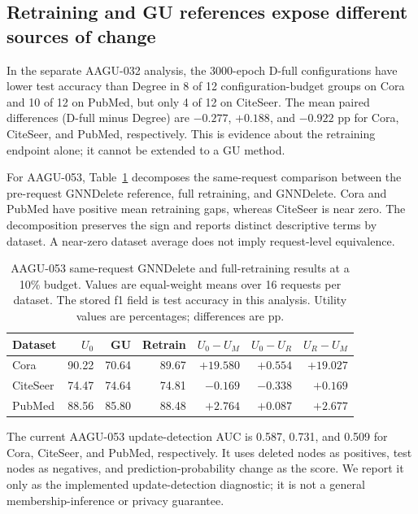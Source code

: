 \subsection{Retraining and GU references expose different sources of change}
In the separate AAGU-032 analysis, the 3000-epoch D-full configurations have lower test accuracy than Degree in 8 of 12 configuration-budget groups on Cora and 10 of 12 on PubMed, but only 4 of 12 on CiteSeer. The mean paired differences (D-full minus Degree) are $-0.277$, $+0.188$, and $-0.922$ pp for Cora, CiteSeer, and PubMed, respectively. This is evidence about the retraining endpoint alone; it cannot be extended to a GU method.

For AAGU-053, Table~\ref{tab:aagu053} decomposes the same-request comparison between the pre-request GNNDelete reference, full retraining, and GNNDelete. Cora and PubMed have positive mean retraining gaps, whereas CiteSeer is near zero. The decomposition preserves the sign and reports distinct descriptive terms by dataset. A near-zero dataset average does not imply request-level equivalence.

\begin{table}[t]
\centering
\small
\caption{AAGU-053 same-request GNNDelete and full-retraining results at a 10\% budget. Values are equal-weight means over 16 requests per dataset. The stored f1 field is test accuracy in this analysis. Utility values are percentages; differences are pp.}
\label{tab:aagu053}
\begin{tabular}{lrrrrrr}
\toprule
Dataset & $U_0$ & GU & Retrain & $U_0-U_M$ & $U_0-U_R$ & $U_R-U_M$ \\
\midrule
Cora & 90.22 & 70.64 & 89.67 & $+19.580$ & $+0.554$ & $+19.027$ \\
CiteSeer & 74.47 & 74.64 & 74.81 & $-0.169$ & $-0.338$ & $+0.169$ \\
PubMed & 88.56 & 85.80 & 88.48 & $+2.764$ & $+0.087$ & $+2.677$ \\
\bottomrule
\end{tabular}
\end{table}

The current AAGU-053 update-detection AUC is 0.587, 0.731, and 0.509 for Cora, CiteSeer, and PubMed, respectively. It uses deleted nodes as positives, test nodes as negatives, and prediction-probability change as the score. We report it only as the implemented update-detection diagnostic; it is not a general membership-inference or privacy guarantee.
